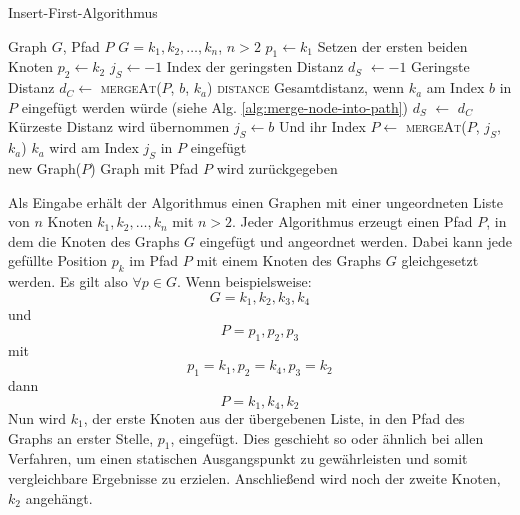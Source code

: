 \begin{algorithm}[H]
    \caption{Insert-First-Algorithmus}
    \label{alg:insert-first}
    \begin{algorithmic}[1]
        \Require Graph $G$, Pfad $P$
        \Require $G = k_1,k_2,\ldots,k_n$, $n > 2$
        \State $p_1 \gets k_1$
        \Comment Setzen der ersten beiden Knoten
        \State $p_2 \gets k_2$
            \State $j_S \gets -1$
            \Comment Index der geringsten Distanz
            \State $d_S$ $\gets -1$
            \Comment Geringste Distanz
                \State $d_C \gets$ \textsc{mergeAt}($P$, $b$, $k_a$) \textsc{distance}
                \Comment Gesamtdistanz, wenn $k_a$ am Index $b$ in $P$ eingefügt werden würde (siehe Alg. \vref{alg:merge-node-into-path})
                    \State $d_S$ $\gets$ $d_C$
                    \Comment Kürzeste Distanz wird übernommen
                    \State $j_S \gets b$
                    \Comment Und ihr Index
                \EndIf
            \EndFor
            \State $P \gets$ \textsc{mergeAt}($P$, $j_S$, $k_a$)
            \Comment $k_a$ wird am Index $j_S$ in $P$ eingefügt
        \EndFor \\
        \Return new Graph($P$)
        \Comment Graph mit Pfad $P$ wird zurückgegeben
    \end{algorithmic}
\end{algorithm}
Als Eingabe erhält der Algorithmus einen Graphen mit einer ungeordneten Liste von $n$ Knoten $k_1,k_2,\ldots,k_n$ mit $n > 2$.
Jeder Algorithmus erzeugt einen Pfad $P$, in dem die Knoten des Graphs $G$ eingefügt und angeordnet werden.
Dabei kann jede gefüllte Position $p_k$ im Pfad $P$ mit einem Knoten des Graphs $G$ gleichgesetzt werden.
Es gilt also $\forall p \in G$.
Wenn beispielsweise:
$$G = k_1,k_2,k_3,k_4$$
und
$$P=p_1,p_2,p_3$$
mit
$$p_1=k_1,p_2=k_4,p_3=k_2$$
dann
$$P=k_1,k_4,k_2$$
Nun wird $k_1$, der erste Knoten aus der übergebenen Liste, in den Pfad des Graphs an erster Stelle, $p_1$, eingefügt. 
Dies geschieht so oder ähnlich bei allen Verfahren, um einen statischen Ausgangspunkt zu gewährleisten und somit vergleichbare Ergebnisse zu erzielen.
Anschließend wird noch der zweite Knoten, $k_2$ angehängt.

